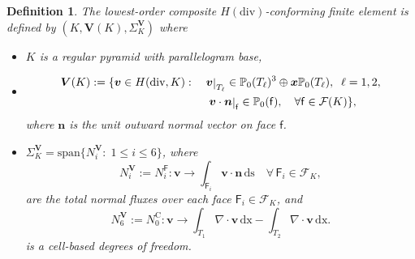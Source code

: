 \documentclass[twoside,reqno,final]{amsart}
\renewcommand{\b}[1]{{\boldsymbol{#1}}}
\def\restrict#1{\raise-0.2ex\hbox{\ensuremath|}_{#1}}
\newcommand{\FC}{\mathcal{F}}
\newcommand{\fc}{\mathsf{f}}
\newcommand{\fcI}{\mathsf{F}}
\newcommand{\bld}[1]{\boldsymbol{#1}}
\newcommand{\divs}{{\nabla\cdot}}
\newtheorem{definition}[theorem]{Definition}
\newcommand{\pol}{\mathbb{P}}
\begin{document}
\begin{definition}
\label{Hdiv-def}
The lowest-order 
composite $H(\mathrm{div})$-conforming finite element is  defined by 
$(K, \b V(K), \Sigma^{\b V}_K)$ where
\begin{itemize}
\item $K$ is a regular pyramid with parallelogram base,
 \item 
 \begin{alignat}{3}
\label{Hdiv}
\bld V(K) :=&\; \{\b v \in H(\mathrm{div},K):&& \;
\b v\restrict{T_\ell}\in \pol_0(T_\ell)^3\oplus \bld x\pol_0(T_\ell),\;\; \ell = 1,2,\\
& &&\;\;\b v\cdot \b n\restrict{\fc}\in \pol_{0}(\fc),\quad\forall \fc\in \FC(K)\},\nonumber
\end{alignat}
where $\b n$ is the unit outward normal vector on face $\fc$.
\item 
$\Sigma_K^{\b V}=\mathrm{span}\{N_i^{\b V}:\;1\le i\le 6\}$, where
\[
N_i^{\b V}:= N_i^{\fcI}: \b v\longrightarrow \int_{\fcI_i} \b v\cdot \b n\,\mathrm{ds} \quad \forall\, \fcI_i\in \FC_K,
\]
are the total normal fluxes over each face $\fcI_i\in \FC_K$,
and 
\[
N_6^{\b V}:= N_0^{\mathrm{C}}: \b v\longrightarrow 
\int_{T_1} \divs\b v\,\mathrm{dx}-
 \int_{T_2} \divs\b v\,\mathrm{dx}.
\]
is a cell-based degrees of freedom.
\end{itemize}
\end{definition}
\end{document}
